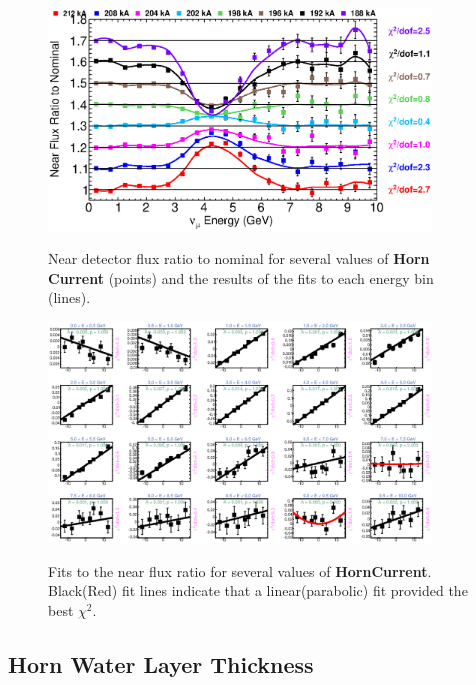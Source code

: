 \begin{figure}[ht]
  \begin{center}
    {\includegraphics[width=4.0in]{figures/HornCurrent_near_summary.eps}}
  \end{center}
\caption{ Near detector flux ratio to nominal for several values of {\bf Horn Current} (points) and the results of the fits to each energy bin (lines).}
\end{figure}

\begin{figure}[hb]
  \begin{center}
    {\includegraphics[width=4.0in]{figures/HornCurrent_near_fits.eps}}
  \end{center}
\caption{ Fits to the near flux ratio for several values of {\bf HornCurrent}. Black(Red) fit lines indicate that a linear(parabolic) fit provided the best $\chi^2$. }
\end{figure}

\clearpage
\subsection{Horn Water Layer Thickness}

